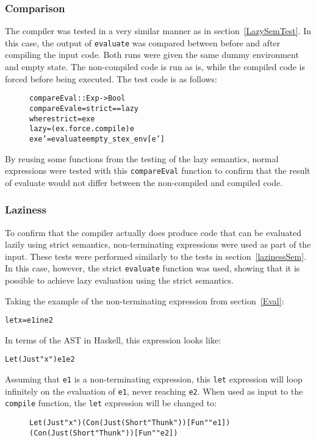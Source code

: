 \subsubsection{Comparison}

The compiler was tested in a very similar manner as in
section~\ref{LazySemTest}. In this case, the output of \texttt{evaluate}
was compared between
before and after compiling the input code. Both runs were given the same
dummy environment and empty state. The non-compiled code is run as is, while
the compiled code is forced before being executed.
The test code is as follows:

\begin{figure}[!ht]
\begin{alltt}
compareEval :: Exp -> Bool
compareEval e = strict == lazy
  where strict = ex e
        lazy   = (ex . force . compile) e
        ex e'  = evaluate empty_st ex_env [e']
\end{alltt}
\end{figure}

\noindent By reusing some functions from the testing of the lazy semantics,
normal expressions were tested with this \texttt{compareEval}
function to confirm that the result of evaluate would not differ between the
non-compiled and compiled code.


\subsubsection{Laziness}

To confirm that the compiler actually does produce code that can be evaluated
lazily using strict semantics, non-terminating expressions were used as part
of the input. These tests were performed similarly to the tests in
section~\ref{lazinessSem}. In this case, however, the strict \texttt{evaluate}
function was used, showing that it is possible to achieve lazy evaluation
using the strict semantics.

Taking the example of the non-terminating expression from section~\ref{Eval}:
\begin{alltt}
  let x = e1 in e2
\end{alltt}
In terms of the AST in Haskell, this expression looks like:
\begin{alltt}
  Let (Just "x") e1 e2
\end{alltt}
Assuming that \texttt{e1} is a non-terminating expression, this \texttt{let}
expression will loop infinitely on the evaluation of \texttt{e1}, never reaching
\texttt{e2}. When used as input to the \texttt{compile} function, the
\texttt{let} expression will be changed to:
\begin{figure}[!ht]
\begin{alltt}
  Let (Just "x") (Con (Just (Short "Thunk")) [Fun "" e1])
                 (Con (Just (Short "Thunk")) [Fun "" e2])
\end{alltt}
\end{figure}

